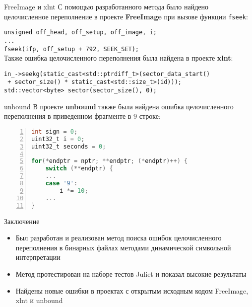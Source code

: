 \documentclass[10pt]{beamer}
\begin{document}
\begin{frame}[fragile]{FreeImage и xlnt}
С помощью разработанного метода было найдено целочисленное переполнение в
проекте \textbf{FreeImage} при вызове функции \texttt{fseek}:

\texttt{unsigned off\_head, off\_setup, off\_image, i;}\\
\texttt{...}\\
\texttt{fseek(ifp, off\_setup + 792, SEEK\_SET);} \\[2em]

Также ошибка целочисленного переполнения была найдена в проекте \textbf{xlnt}:

\texttt{in\_->seekg(static\_cast<std::ptrdiff\_t>(sector\_data\_start()}\\
\texttt{    + sector\_size() * static\_cast<std::size\_t>(id)));} \\
\texttt{std::vector<byte> sector(sector\_size(), 0);}
\end{frame}

\begin{frame}[fragile]{unbound}
В проекте \textbf{unbound} также была найдена ошибка целочисленного переполнения в
приведенном фрагменте в 9 строке:

\begin{lstlisting}[language=C,frame=none,basicstyle=\ttfamily, numbers=left,
                   xleftmargin=2em, numberstyle=\tiny\color{gray}]
int sign = 0;
uint32_t i = 0;
uint32_t seconds = 0;

for(*endptr = nptr; **endptr; (*endptr)++) {
    switch (**endptr) {
    ...
    case '9':
        i *= 10;
    ...
}
\end{lstlisting}
\end{frame}

\begin{frame}{Заключение}
\begin{itemize}
    \item Был разработан и реализован метод поиска ошибок целочисленного переполнения в
        бинарных файлах методами динамической символьной интерпретации
    \item Метод протестирован на наборе тестов Juliet и показал высокие
        результаты
    \item Найдены новые ошибки в проектах с открытым исходным кодом FreeImage, xlnt и
        unbound
\end{itemize}
\end{frame}
\end{document}
